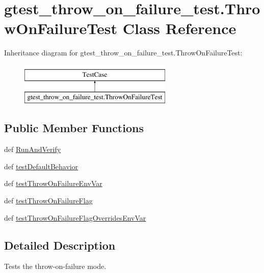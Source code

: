 \hypertarget{classgtest__throw__on__failure__test_1_1_throw_on_failure_test}{\section{gtest\-\_\-throw\-\_\-on\-\_\-failure\-\_\-test.\-Throw\-On\-Failure\-Test Class Reference}
\label{classgtest__throw__on__failure__test_1_1_throw_on_failure_test}
}
Inheritance diagram for gtest\-\_\-throw\-\_\-on\-\_\-failure\-\_\-test.\-Throw\-On\-Failure\-Test\-:\begin{figure}[H]
\begin{center}
\leavevmode
\includegraphics[height=2.000000cm]{classgtest__throw__on__failure__test_1_1_throw_on_failure_test}
\end{center}
\end{figure}
\subsection*{Public Member Functions}
\begin{DoxyCompactItemize}
\item 
def \hyperlink{classgtest__throw__on__failure__test_1_1_throw_on_failure_test_a98881d3352e7aff479be757151c8e241}{Run\-And\-Verify}
\item 
def \hyperlink{classgtest__throw__on__failure__test_1_1_throw_on_failure_test_a24612a4243bfa5733701044daaa056ea}{test\-Default\-Behavior}
\item 
def \hyperlink{classgtest__throw__on__failure__test_1_1_throw_on_failure_test_ab55f201633e8bd230a95bb61350f99a9}{test\-Throw\-On\-Failure\-Env\-Var}
\item 
def \hyperlink{classgtest__throw__on__failure__test_1_1_throw_on_failure_test_a9ce7c025ec64ac277c2f870566fed6df}{test\-Throw\-On\-Failure\-Flag}
\item 
def \hyperlink{classgtest__throw__on__failure__test_1_1_throw_on_failure_test_a4ce45db83582fb498c998beef7efede7}{test\-Throw\-On\-Failure\-Flag\-Overrides\-Env\-Var}
\end{DoxyCompactItemize}


\subsection{Detailed Description}
\begin{DoxyVerb}Tests the throw-on-failure mode.\end{DoxyVerb}
 


